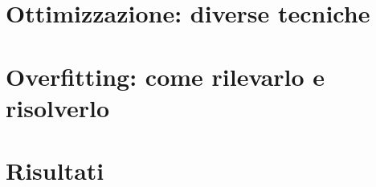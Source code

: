 \section{Ottimizzazione: diverse tecniche}


\section{Overfitting: come rilevarlo e risolverlo}




\section{Risultati}
